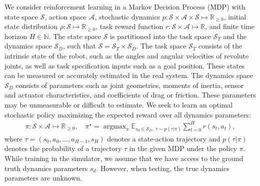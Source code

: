 \documentclass{article}
\newcommand{\R}{\mathbb{R}}
\newcommand{\E}{\mathbb{E}}
\newcommand{\cA}{\mathcal{A}}
\newcommand{\cS}{\mathcal{S}}
\DeclareMathOperator*{\argmax}{argmax}
\newcommand{\sysid}{dynamics}
\begin{document}
We consider reinforcement learning in a Markov Decision Process (MDP)
with state space $\cS$,
action space $\cA$,
stochastic dynamics $p : \cS \times \cA \times \cS \mapsto \R_{\geq 0}$,
initial state distribution $\rho : \cS \mapsto \R_{\geq 0}$,
task reward function $r : \cS \times \cA \mapsto \R$,
and finite time horizon $H \in \mathbb{N}$.
The state space $\cS$ is partitioned into
the task space $\cS_T$
and the dynamics space $\cS_D$, such that $\cS = \cS_T \times \cS_D$.
The task space $\cS_T$ consists of the intrinsic state of the robot, such as the angles and angular velocities of revolute joints,
as well as task specification inputs such as a goal position.
These states can be measured or accurately estimated in the real system.
The \sysid{} space $\cS_D$ consists of parameters such as joint geometries, moments of inertia, sensor and actuator characteristics, and coefficients of drag or friction.
These parameters may be unmeasurable or difficult to estimate.
We seek to learn an optimal stochastic policy maximizing the expected reward over all \sysid{} parameters:
\begin{equation}\begin{split}
\pi : \cS \times \cA \mapsto \R_{\geq 0}, \quad
\pi^\star = \argmax_\pi \E_{s_d \in \cS_D,\ \tau \sim p(\tau|\pi)} \sum_{t = 0}^H
r(s_t, a_t),
\label{objective}
\end{split}\end{equation}
where $\tau = (s_0, a_0, \dots, a_{H-1}, s_H)$ denotes a state-action trajectory
and $p(\tau | \pi)$ denotes the probability of a trajectory $\tau$ in the given MDP under the policy $\pi$.
While training in the simulator, we assume that we have access to the ground truth \sysid{} parameters $s_d$.
However, when testing, the true \sysid{} parameters are unknown.
\end{document}
